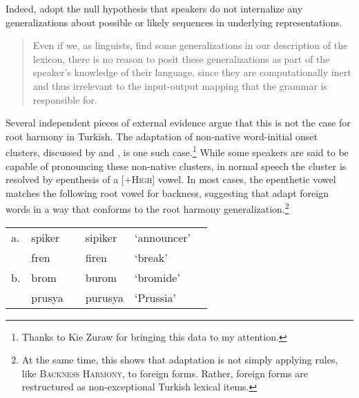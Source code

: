 Indeed, \citeauthor{PE} adopt the null hypothesis that speakers do not internalize any generalizations about possible or likely sequences in underlying representations.

\begin{quote}
Even if we, as linguists, find some generalizations in our description of the lexicon, there is no reason to posit these generalizations as part of the speaker's knowledge of their language, since they are computationally inert and thus irrelevant to the input-output mapping that the grammar is responsible for. \citep[][18]{PE}
\end{quote}

Several independent pieces of external evidence argue that this is not the case for root harmony in Turkish. 
The adaptation of non-native word-initial onset clusters, discussed by \citet{Clements1982} and \citet{Kaun1999}, is one such case.\footnote{Thanks to Kie Zuraw for bringing this data to my attention.} While some speakers are said to be capable of pronouncing these non-native clusters, in normal speech the cluster is resolved by epenthesis of a [$+$\textsc{High}] vowel. In most cases, the epenthetic vowel matches the following root vowel for backness, suggesting that adapt foreign words in a way that conforms to the root harmony generalization.\footnote{At the same time, this shows that adaptation is not simply applying rules, like \textsc{Backness Harmony}, to foreign forms. Rather, foreign forms are restructured as non-exceptional Turkish lexical items.}


\begin{example} 
\begin{tabular}{l l l l l l}
a. & {spiker}  & \alt{} & {sipiker}  & `announcer' \\
   & {fren}    & \alt{} & {firen}    & `break'     \\
b. & {brom}    & \alt{} & {burom}    & `bromide'   \\
   & {prusya}  & \alt{} & {purusya}  & `Prussia'   \\
\end{tabular}
\end{example}

